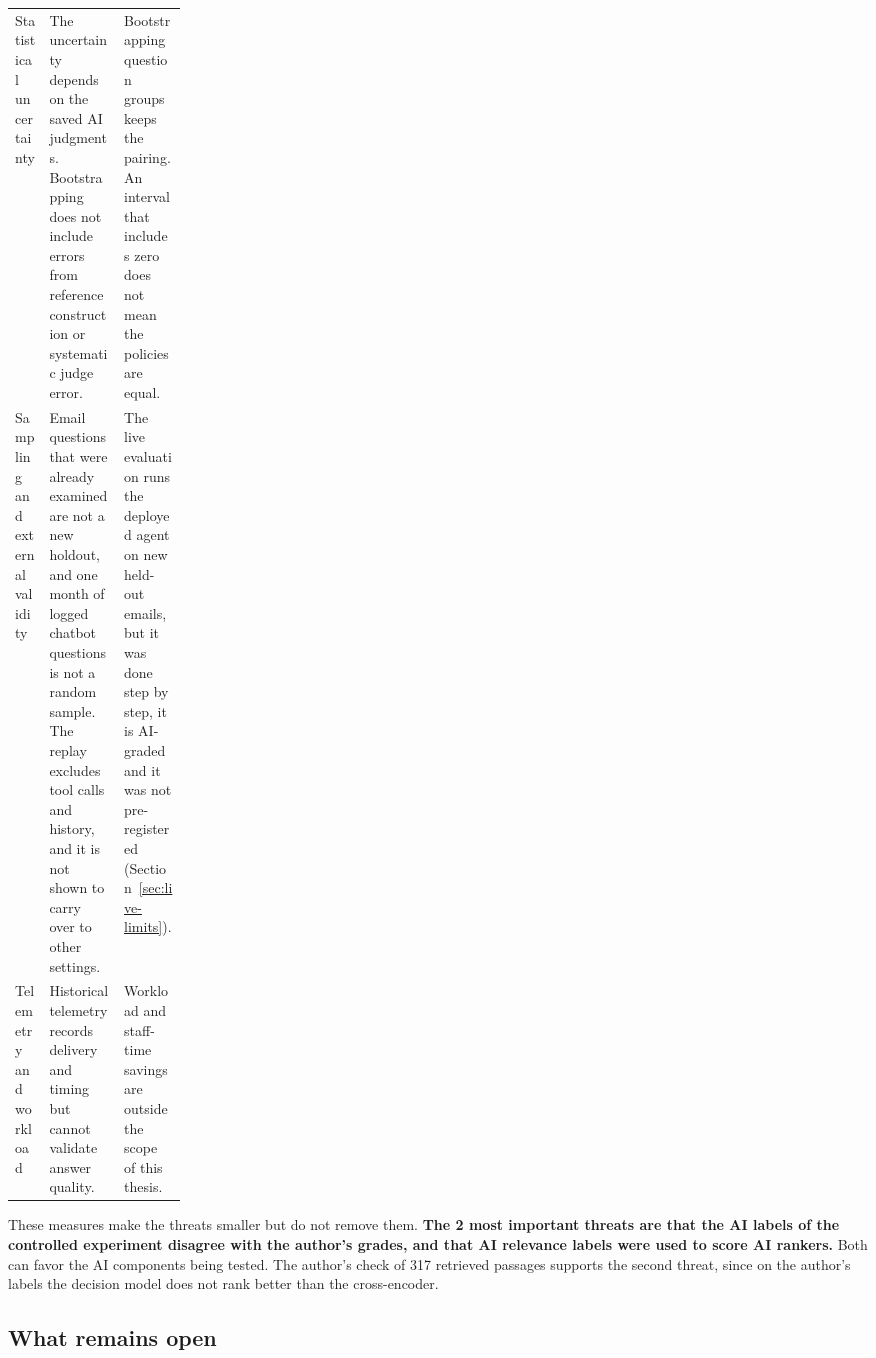 \begin{table}[htbp]
\begin{tabularx}{\linewidth}{@{}>{\raggedright\arraybackslash}p{0.2\linewidth}>{\raggedright\arraybackslash}X>{\raggedright\arraybackslash}X@{}}
Statistical uncertainty & The uncertainty depends on the saved AI judgments. Bootstrapping does not include errors from reference construction or systematic judge error. & Bootstrapping question groups keeps the pairing. An interval that includes zero does not mean the policies are equal. \\
Sampling and external validity & Email questions that were already examined are not a new holdout, and one month of logged chatbot questions is not a random sample. The replay excludes tool calls and history, and it is not shown to carry over to other settings. & The live evaluation runs the deployed agent on new held-out emails, but it was done step by step, it is AI-graded and it was not pre-registered (Section~\ref{sec:live-limits}). \\
Telemetry and workload & Historical telemetry records delivery and timing but cannot validate answer quality. & Workload and staff-time savings are outside the scope of this thesis. \\
\bottomrule
\end{tabularx}
\end{table}

These measures make the threats smaller but do not remove them. \textbf{The 2 most important threats are that the AI labels of the controlled experiment disagree with the author's grades, and that AI relevance labels were used to score AI rankers.} Both can favor the AI components being tested. The author's check of 317 retrieved passages supports the second threat, since on the author's labels the decision model does not rank better than the cross-encoder.

\subsection{What remains open}

